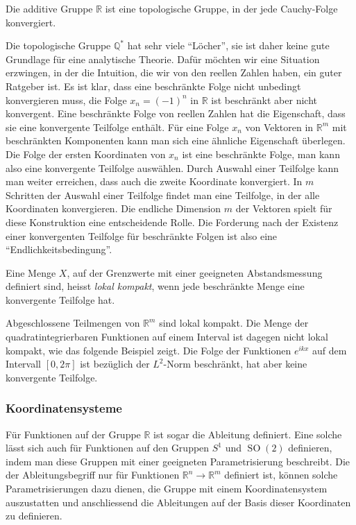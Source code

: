 \begin{beispiel}
Die additive Gruppe $\mathbb{R}$ ist eine topologische Gruppe, in der
jede Cauchy-Folge konvergiert.
\end{beispiel}

Die topologische Gruppe $\mathbb{Q}^*$ hat sehr viele ``Löcher'', sie ist
daher keine gute Grundlage für eine analytische Theorie.
Dafür möchten wir eine Situation erzwingen, in der die Intuition, die 
wir von den reellen Zahlen haben, ein guter Ratgeber ist.
Es ist klar, dass eine beschränkte Folge nicht unbedingt konvergieren
muss, die Folge $x_n=(-1)^n$ in $\mathbb{R}$ ist beschränkt aber nicht
konvergent.
Eine beschränkte Folge von reellen Zahlen hat die Eigenschaft, dass 
sie eine konvergente Teilfolge enthält.
Für eine Folge $x_n$ von Vektoren in $\mathbb{R}^m$ mit beschränkten Komponenten
kann man sich eine ähnliche Eigenschaft überlegen.
Die Folge der ersten Koordinaten von $x_n$ ist eine beschränkte Folge,
man kann also eine konvergente Teilfolge auswählen.
Durch Auswahl einer Teilfolge kann man weiter erreichen, dass auch die
zweite Koordinate konvergiert.
In $m$ Schritten der Auswahl einer Teilfolge findet man eine
Teilfolge, in der alle Koordinaten konvergieren.
Die endliche Dimension $m$ der Vektoren spielt für diese Konstruktion
eine entscheidende Rolle.
Die Forderung nach der Existenz einer konvergenten Teilfolge für beschränkte
Folgen ist also eine ``Endlichkeitsbedingung''.

\begin{definition}
Eine Menge $X$, auf der Grenzwerte mit einer geeigneten Abstandsmessung
definiert sind, heisst {\em lokal kompakt}, wenn jede beschränkte Menge
eine konvergente Teilfolge hat.
\end{definition}

Abgeschlossene Teilmengen von $\mathbb{R}^m$ sind lokal kompakt.
Die Menge der quadratintegrierbaren Funktionen auf einem Interval
ist dagegen nicht lokal kompakt, wie das folgende Beispiel zeigt.
Die Folge der Funktionen $e^{ikx}$ auf dem Intervall $[0,2\pi]$ ist
bezüglich der $L^2$-Norm beschränkt, hat aber keine konvergente
Teilfolge.

%
%
\subsubsection{Koordinatensysteme}
Für Funktionen auf der Gruppe $\mathbb{R}$ ist sogar die Ableitung
definiert.
Eine solche lässt sich auch für Funktionen auf den Gruppen 
$S^1$ und $\operatorname{SO}(2)$ definieren, indem man diese Gruppen
mit einer geeigneten Parametrisierung beschreibt.
Die der Ableitungsbegriff nur für Funktionen $\mathbb{R}^n \to\mathbb{R}^m$
definiert ist, können solche Parametrisierungen dazu dienen,
die Gruppe mit einem Koordinatensystem auszustatten und anschliessend
die Ableitungen auf der Basis dieser Koordinaten zu definieren.

